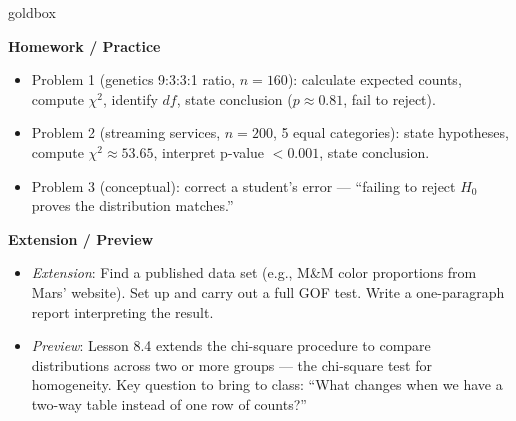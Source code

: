 \documentclass[10pt]{article}
\begin{document}
\begin{skillbox}{goldbox}
\begin{minipage}[t]{0.48\linewidth}
    \textbf{Homework / Practice}
    \begin{itemize}
        \item Problem 1 (genetics 9:3:3:1 ratio, $n = 160$): calculate expected
              counts, compute $\chi^2$, identify $df$, state conclusion
              ($p \approx 0.81$, fail to reject).
        \item Problem 2 (streaming services, $n = 200$, 5 equal categories):
              state hypotheses, compute $\chi^2 \approx 53.65$, interpret
              p-value $< 0.001$, state conclusion.
        \item Problem 3 (conceptual): correct a student's error ---
              ``failing to reject $H_0$ proves the distribution matches.''
    \end{itemize}
\end{minipage}
\hfill
\begin{minipage}[t]{0.48\linewidth}
    \textbf{Extension / Preview}
    \begin{itemize}
        \item \textit{Extension}: Find a published data set (e.g., M\&M color
              proportions from Mars' website). Set up and carry out a full GOF
              test. Write a one-paragraph report interpreting the result.
        \item \textit{Preview}: Lesson 8.4 extends the chi-square procedure to
              compare distributions across two or more groups --- the
              chi-square test for homogeneity. Key question to bring to class:
              ``What changes when we have a two-way table instead of one row
              of counts?''
    \end{itemize}
\end{minipage}
\end{skillbox}
\end{document}
